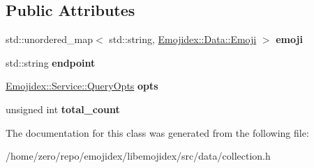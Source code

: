 \subsection*{Public Attributes}
\begin{DoxyCompactItemize}
\item 
std\+::unordered\+\_\+map$<$ std\+::string, \hyperlink{classEmojidex_1_1Data_1_1Emoji}{Emojidex\+::\+Data\+::\+Emoji} $>$ {\bfseries emoji}\hypertarget{classEmojidex_1_1Data_1_1Collection_aa8164e800401e64ce162ee5e734d9e74}{}\label{classEmojidex_1_1Data_1_1Collection_aa8164e800401e64ce162ee5e734d9e74}

\item 
std\+::string {\bfseries endpoint}\hypertarget{classEmojidex_1_1Data_1_1Collection_a937eedb36767877da7c793625bf919a6}{}\label{classEmojidex_1_1Data_1_1Collection_a937eedb36767877da7c793625bf919a6}

\item 
\hyperlink{classEmojidex_1_1Service_1_1QueryOpts}{Emojidex\+::\+Service\+::\+Query\+Opts} {\bfseries opts}\hypertarget{classEmojidex_1_1Data_1_1Collection_ade67a564b14f14375af66bc1a550ecdb}{}\label{classEmojidex_1_1Data_1_1Collection_ade67a564b14f14375af66bc1a550ecdb}

\item 
unsigned int {\bfseries total\+\_\+count}\hypertarget{classEmojidex_1_1Data_1_1Collection_a0355662d1097dd631a6d6ce09875e8c3}{}\label{classEmojidex_1_1Data_1_1Collection_a0355662d1097dd631a6d6ce09875e8c3}

\end{DoxyCompactItemize}


The documentation for this class was generated from the following file\+:\begin{DoxyCompactItemize}
\item 
/home/zero/repo/emojidex/libemojidex/src/data/collection.\+h\end{DoxyCompactItemize}
